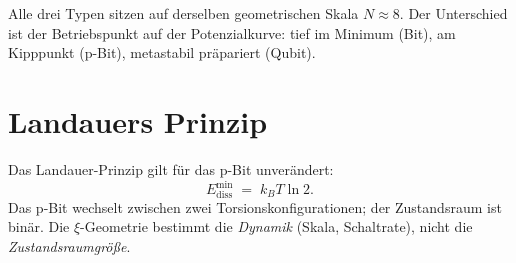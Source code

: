 	{\footnotesize
	\begin{center}
	\end{center}
	\begin{center}
	\end{center}
	}
	
	Alle drei Typen sitzen auf derselben geometrischen Skala $N \approx 8$.
	Der Unterschied ist der Betriebspunkt auf der Potenzialkurve:
	tief im Minimum (Bit), am Kipppunkt (p-Bit), metastabil präpariert (Qubit).
	
	\section{Landauers Prinzip}
	\label{sec:landauer}
	
	Das Landauer-Prinzip \cite{Landauer1961} gilt für das p-Bit unverändert:
	\begin{equation}
		E_\text{diss}^\text{min} \;=\; k_B T \ln 2.
		\label{eq:landauer}
	\end{equation}
	Das p-Bit wechselt zwischen zwei Torsionskonfigurationen; der
	Zustandsraum ist binär. Die $\xi$-Geometrie bestimmt die \emph{Dynamik}
	(Skala, Schaltrate), nicht die \emph{Zustandsraumgröße}.
	
